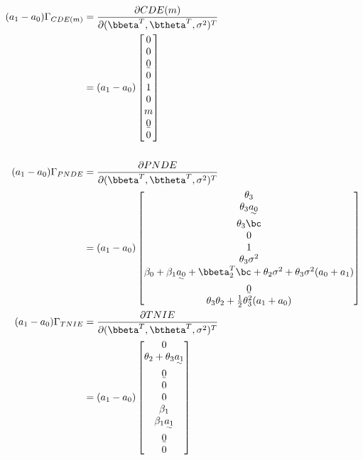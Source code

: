 \documentclass[dvipdfmx,10pt]{article}
\begin{document}
\begin{align*}
  (a_{1}-a_{0})\Gamma_{CDE(m)}
  &= \frac{\partial CDE(m)}{\partial (\bbeta^{T},\btheta^{T},\sigma^2)^{T}}\\
  &= (a_{1}-a_{0})
    \begin{bmatrix}
      0\\
      0\\
      \b0\\
      0\\
      1\\
      0\\
      m\\
      \b0\\
      0\\
    \end{bmatrix}\\
  \\
  (a_{1}-a_{0})\Gamma_{PNDE}
  &= \frac{\partial PNDE}{\partial (\bbeta^{T},\btheta^{T},\sigma^2)^{T}}\\
  &= (a_{1}-a_{0})
    \begin{bmatrix}
      \theta_{3}\\
      \theta_{3}\uwave{a_{0}}\\
      \theta_{3}\bc\\
      0\\
      1\\
      \theta_{3}\sigma^{2}\\
      \beta_{0} + \beta_{1}\uwave{a_{0}} + \bbeta_{2}^{T}\bc + \theta_{2}\sigma^{2} + \theta_{3}\sigma^{2}(a_{0} + a_{1})\\
      \b0\\
      \theta_{3}\theta_{2} + \frac{1}{2}\theta_{3}^{2}(a_{1} + a_{0})\\
    \end{bmatrix}\\
  (a_{1}-a_{0})\Gamma_{TNIE}
  &= \frac{\partial TNIE}{\partial (\bbeta^{T},\btheta^{T},\sigma^2)^{T}}\\
  &= (a_{1}-a_{0})
    \begin{bmatrix}
      0\\
      \theta_{2} + \theta_{3}\uwave{a_{1}}\\
      \b0\\
      0\\
      0\\
      \beta_{1}\\
      \beta_{1}\uwave{a_{1}}\\
      \b0\\
      0\\

\end{bmatrix}
\end{align*}
\end{document}
